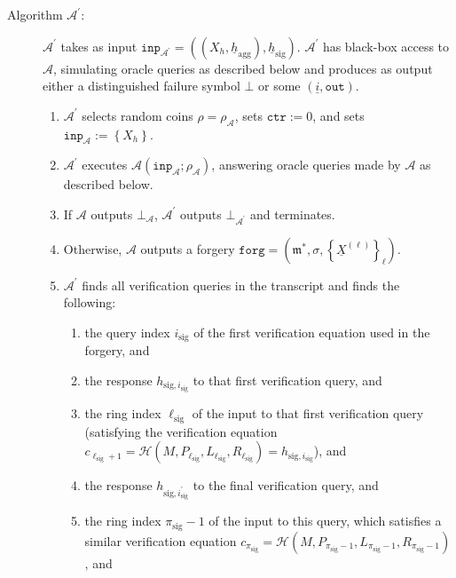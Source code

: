 \documentclass{mrl}
\theoremstyle{definition}
\numberwithin{theorem}{subsection}
\newcommand{\adversary}{\mathcal{A}}
\newcommand{\m}{\mathfrak{m}}
\begin{document}
\begin{description}
\item [Algorithm $\adversary^\prime$:] $\adversary^\prime$ takes as input $\texttt{inp}_{\adversary^\prime} = ((X_h, \underline{h}_{\text{agg}}), \underline{h}_{\text{sig}})$. $\adversary^\prime$ has black-box access to $\adversary$, simulating oracle queries as described below and produces as output either a distinguished failure symbol $\bot$ or some $(\underline{i}, \texttt{out})$. 
\begin{enumerate}
\item $\adversary^\prime$ selects random coins $\rho = \rho_\adversary$, sets $\texttt{ctr}:=0$, and sets $\texttt{inp}_\adversary := \left\{X_h\right\}$.

\item $\adversary^\prime$ executes $\adversary(\texttt{inp}_\adversary; \rho_\adversary)$, answering oracle queries made by $\adversary$ as described below.

\item If $\adversary$ outputs $\bot_\adversary$, $\adversary^\prime$ outputs $\bot_{\adversary^\prime}$ and terminates. 

\item Otherwise, $\adversary$ outputs a forgery $\texttt{forg} = (\m^*, \sigma, \left\{\underline{X}^{(\ell)}\right\}_{\ell})$. 

\item $\adversary^\prime$ finds all verification queries in the transcript and finds the following:
\begin{enumerate} 
\item the query index $i_{\text{sig}}$  of the first verification equation used in the forgery, and

\item the response $h_{\text{sig},i_{\text{sig}}}$ to that first verification query, and

\item the ring index $\ell_{\text{sig}}$ of the input to that first verification query (satisfying the verification equation $c_{\ell_{\text{sig}}+1} = \mathcal{H}(M, P_{\ell_{\text{sig}}}, L_{\ell_{\text{sig}}}, R_{\ell_{\text{sig}}}) = h_{\text{sig}, i_{\text{sig}}}$), and

\item the response $h_{\text{sig}, i_{\text{sig}}^\prime}$ to the final verification query, and

\item the ring index $\pi_{\text{sig}}-1$ of the input to this query, which satisfies a similar verification equation $c_{\pi_{\text{sig}}} = \mathcal{H}(M, P_{\pi_{\text{sig}}-1}, L_{\pi_{\text{sig}} -1}, R_{\pi_{\text{sig}} - 1})$, and


\end{enumerate}
\end{enumerate}
\end{description}
\end{document}
